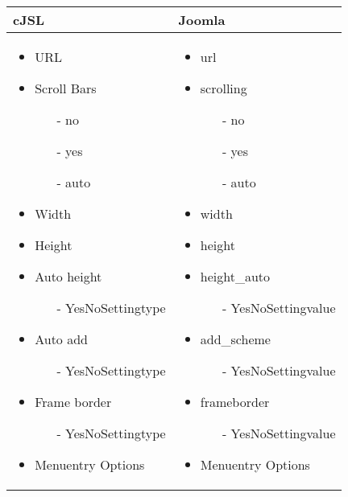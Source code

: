 \begin{minipage}{0.7\textwidth}
\begin{tabular}{|p{} | p{}|}
\hline
\textbf{cJSL} & \textbf{Joomla} \\ 
\hline
\begin{itemize}
\item URL 
\item Scroll Bars
\begin{enumerate}
	\item[-] no
	\item[-] yes
	\item[-] auto
\end{enumerate} 
\item Width 
\item Height 
\item Auto height
\begin{enumerate}
	\item[-] YesNoSettingtype
\end{enumerate} 
\item Auto add
\begin{enumerate}
	\item[-] YesNoSettingtype
\end{enumerate}
\item Frame border
\begin{enumerate}
	\item[-] YesNoSettingtype
\end{enumerate}
\item Menuentry Options
\end{itemize}
 & 
\begin{itemize}
\item url 
\item scrolling
\begin{enumerate}
	\item[-] no
	\item[-] yes
	\item[-] auto
\end{enumerate} 
\item width 
\item height 
\item height\_auto
\begin{enumerate}
	\item[-] YesNoSettingvalue
\end{enumerate} 
\item add\_scheme
\begin{enumerate}
	\item[-] YesNoSettingvalue
\end{enumerate}
\item frameborder
\begin{enumerate}
	\item[-] YesNoSettingvalue
\end{enumerate}
\item Menuentry Options
\end{itemize}
\\
\hline
\end{tabular}
\end{minipage}

